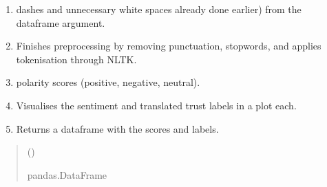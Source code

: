 \documentclass[letterpaper,10pt,english]{sphinxhowto}
\begin{document}
\begin{fulllineitems}
\label{\detokenize{_autosummary/custom_packages.modelling_modules.nlp_modelling.sentiment_analysis_using_nltk:custom_packages.modelling_modules.nlp_modelling.sentiment_analysis_using_nltk}}
\pysigstartsignatures
\pysiglinewithargsret
{}
{}
{}
\pysigstopsignatures\begin{enumerate}
%
\item {} \begin{description}
\sphinxAtStartPar
dashes and unnecessary white spaces already done earlier) from the dataframe argument.

\end{description}

\item {} 
\sphinxAtStartPar
Finishes preprocessing by removing punctuation, stopwords, and applies tokenisation through NLTK.

\item {} \begin{description}
\sphinxAtStartPar
polarity scores (positive, negative, neutral).

\end{description}

\item {} 
\sphinxAtStartPar
Visualises the sentiment and translated trust labels in a plot each.

\item {} 
\sphinxAtStartPar
Returns a dataframe with the scores and labels.

\end{enumerate}
\begin{quote}\begin{description}
\sphinxAtStartPar
{} ()

\sphinxAtStartPar
pandas.DataFrame

\end{description}\end{quote}

\end{fulllineitems}
\end{document}
